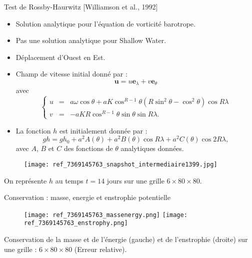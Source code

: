 \documentclass[11pt]{beamer}
\begin{document}
\begin{frame}{Test de Rossby-Haurwitz [Williamson et al., 1992]}
\begin{exampleblock}{}
\begin{itemize}
\item Solution analytique pour l'équation de vorticité barotrope.
\item Pas une solution analytique pour Shallow Water.
\item Déplacement d'Ouest en Est.
\item Champ de vitesse initial donné par :
$$
\mathbf{u} = u \mathbf{e}_{\lambda} + v \mathbf{e}_{\theta}
$$
avec 
$$
\left\lbrace
\begin{array}{rcl}
u & = & a \omega \cos \theta + a K \cos^{R-1} \theta \left( R \sin^2 \theta - \cos^2 \theta \right) \cos R \lambda\\
v & = & - a K R \cos^{R-1} \theta \sin \theta \sin R \lambda.
\end{array}
\right.
$$
\item La fonction $h$ est initialement donnée par :
\begin{equation}
gh = gh_0 + a^2 A(\theta) + a^2 B(\theta) \cos R \lambda + a^2 C(\theta) \cos 2 R \lambda,
\end{equation}
avec $A$, $B$ et $C$ des fonctions de $\theta$ analytiques données.
\end{itemize}
\end{exampleblock}
\end{frame}



\begin{frame}{}
\begin{figure}
\texttt{[image: ref\_7369145763\_snapshot\_intermediaire1399.jpg]}
\end{figure}
On représente $h$ au temps $t=14$ jours sur une grille $6 \times 80 \times 80$.
\end{frame}






\begin{frame}{Conservation : masse, energie et enstrophie potentielle}
\begin{figure}
\texttt{[image: ref\_7369145763\_massenergy.png]}
\texttt{[image: ref\_7369145763\_enstrophy.png]}
\end{figure}
Conservation de la masse et de l'énergie (gauche) et de l'enstrophie (droite) sur une grille : $6 \times 80 \times 80$ (Erreur relative). 
\end{frame}
\end{document}
